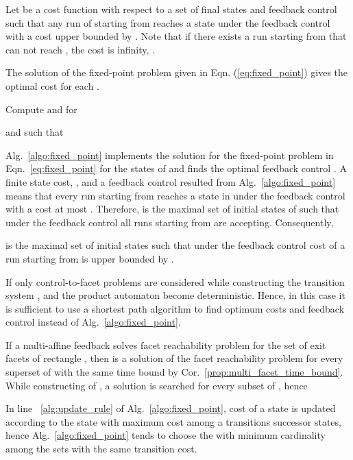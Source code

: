 \documentclass{ifacconf}
\begin{document}
Let  be a cost function with respect to a set of final states  and feedback control  such that any run of  starting from  reaches a state  under the feedback control  with a cost upper bounded by  . Note that if there exists a run starting from  that can not reach , the cost is infinity, .

The solution of the fixed-point problem given in Eqn. (\ref{eq:fixed_point}) gives the optimal cost for each .
	


	
\begin{algorithm}\caption{\small{Compute  and  for  }}
\label{algo:fixed_point}
\small{
\begin{algorithmic}[1]
	\State 
	\State 
	\State  and  such that 
	\While{ }
		\State 
			\If{} \label{alg:update_rule}
				\State 			
				\State 
				\State 
			\EndIf
	\EndWhile
\end{algorithmic}
}
\end{algorithm}

Alg.~\ref{algo:fixed_point} implements the solution for the fixed-point problem in Eqn.~\eqref{eq:fixed_point} for the states of 
and finds the optimal feedback control . 
A finite state cost, , and a feedback control  resulted from Alg.~\ref{algo:fixed_point} means that every run starting from  reaches a state  in  under the feedback control  with a cost at most . Therefore,  is the maximal set of initial states of  such that under the feedback control  all runs starting from  are accepting. 
Consequently, 
 
is the maximal set of initial states such that under the feedback control  cost of a run starting from  is upper bounded by .

If only control-to-facet problems are considered while constructing the transition system ,  and the product automaton  become deterministic. Hence, in this case it is sufficient to use a shortest path algorithm to find optimum costs and feedback control  instead of Alg.~\ref{algo:fixed_point}.

If a multi-affine feedback  solves facet reachability problem for the set of exit facets  of rectangle , then  is a solution of the facet reachability problem for every superset  of  with the same time bound  by Cor.~\ref{prop:multi_facet_time_bound}. While constructing  of , a solution is searched for every subset of , hence
 
In line~ \ref{alg:update_rule} of Alg.~\ref{algo:fixed_point}, cost of a state is updated according to the state with maximum cost among a transitions successor states, hence Alg.~\ref{algo:fixed_point} tends to choose the  with minimum cardinality among the sets  with the same transition cost.
\end{document}
